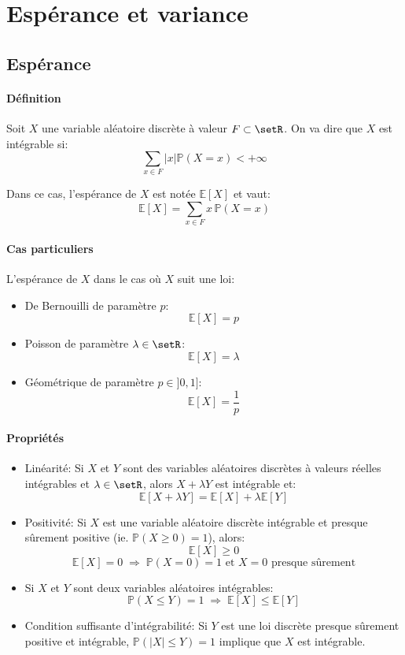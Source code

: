 \documentclass[a4paper,10pt,french,openany]{memoir}
\newcommand{\Proba}{\mathbb{P}}
\newcommand{\Esper}{\mathbb{E}}
\newcommand{\abs}[1]{\lvert #1 \rvert}
\begin{document}
\section{Espérance et variance}

\subsection{Espérance}

\paragraph{Définition}
Soit $X$ une variable aléatoire discrète à valeur $F\subset \setR$. On va dire que $X$ est intégrable si:
\[\sum_{x\in F} \lvert x \rvert \Proba(X=x) < +\infty \]

Dans ce cas, l'espérance de $X$ est notée $\Esper[X]$ et vaut:
\[ \Esper[X]=\sum_{x\in F} x\, \Proba(X=x) \]

\paragraph{Cas particuliers}
L'espérance de $X$ dans le cas où $X$ suit une loi:
\begin{itemize}
 \item De Bernouilli de paramètre $p$: \[ \Esper[X]=p \]
 \item Poisson de paramètre $\lambda \in \setR$: \[\Esper[X]=\lambda\]
 \item Géométrique de paramètre $p\in ]0,1]$: \[ \Esper[X]=\frac 1 p \]
\end{itemize}

\paragraph{Propriétés}
\begin{itemize}
 \item Linéarité: Si $X$ et $Y$ sont des variables aléatoires discrètes à valeurs réelles intégrables et $\lambda \in \setR$, alors $X + \lambda Y$ est intégrable et: \[\Esper[X+\lambda Y] = \Esper[X] + \lambda\Esper[Y]\]
 \item Positivité: Si $X$ est une variable aléatoire discrète intégrable et presque sûrement positive (ie. $\Proba(X \geq 0) = 1$), alors: \[\Esper[X] \geq 0 \] \[\Esper[X] = 0 \;\Rightarrow\; \Proba(X=0)=1 \text{ et } X=0 \text{ presque sûrement}\]
 \item Si $X$ et $Y$ sont deux variables aléatoires intégrables: \[\Proba(X \leq Y) = 1 \;\Rightarrow\; \Esper[X]\leq\Esper[Y]\]
 \item Condition suffisante d'intégrabilité: Si $Y$ est une loi discrète presque sûrement positive et intégrable, $\Proba(\abs{X}\leq Y) = 1$ implique que $X$ est intégrable.
\end{itemize}
\end{document}
